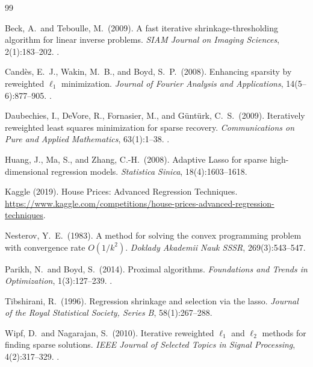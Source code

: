 \documentclass[12pt,a4paper]{article}
\begin{document}

\begin{thebibliography}{99}

Beck, A.\ and Teboulle, M.\ (2009).
\newblock A fast iterative shrinkage-thresholding algorithm for linear inverse
  problems.
\newblock \emph{SIAM Journal on Imaging Sciences}, 2(1):183--202.
\newblock {}.

Cand{\`e}s, E.~J., Wakin, M.~B., and Boyd, S.~P.\ (2008).
\newblock Enhancing sparsity by reweighted $\ell_1$ minimization.
\newblock \emph{Journal of Fourier Analysis and Applications},
  14(5--6):877--905.
\newblock {}.

Daubechies, I., DeVore, R., Fornasier, M., and G{\"u}nt{\"u}rk, C.~S.\ (2009).
\newblock Iteratively reweighted least squares minimization for sparse
  recovery.
\newblock \emph{Communications on Pure and Applied Mathematics},
  63(1):1--38.
\newblock {}.

Huang, J., Ma, S., and Zhang, C.-H.\ (2008).
\newblock Adaptive {Lasso} for sparse high-dimensional regression models.
\newblock \emph{Statistica Sinica}, 18(4):1603--1618.

Kaggle (2019).
\newblock House {Prices}: {Advanced} {Regression} {Techniques}.
\newblock \url{https://www.kaggle.com/competitions/house-prices-advanced-regression-techniques}.

Nesterov, Y.~E.\ (1983).
\newblock A method for solving the convex programming problem with convergence
  rate $O(1/k^2)$.
\newblock \emph{Doklady Akademii Nauk SSSR}, 269(3):543--547.

Parikh, N.\ and Boyd, S.\ (2014).
\newblock Proximal algorithms.
\newblock \emph{Foundations and Trends in Optimization}, 1(3):127--239.
\newblock {}.

Tibshirani, R.\ (1996).
\newblock Regression shrinkage and selection via the lasso.
\newblock \emph{Journal of the Royal Statistical Society, Series B},
  58(1):267--288.

Wipf, D.\ and Nagarajan, S.\ (2010).
\newblock Iterative reweighted $\ell_1$ and $\ell_2$ methods for finding sparse
  solutions.
\newblock \emph{IEEE Journal of Selected Topics in Signal Processing},
  4(2):317--329.
\newblock {}.


\end{thebibliography}
\end{document}
